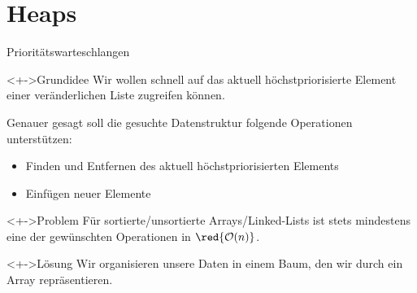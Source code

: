 \section{Heaps}

\begin{frame}{Priorit\"atswarteschlangen}
\begin{block}<+->{Grundidee}
Wir wollen schnell auf das aktuell h\"ochstpriorisierte Element einer \alert{ver\"anderlichen} Liste zugreifen k\"onnen.

Genauer gesagt soll die gesuchte Datenstruktur folgende Operationen unterst\"utzen:
\begin{itemize}
    \item \alert{Finden} und \alert{Entfernen} des aktuell h\"ochstpriorisierten Elements
    \item \alert{Einf\"ugen} neuer Elemente
\end{itemize}
\end{block}

\begin{block}<+->{Problem}
F\"ur sortierte/unsortierte Arrays/Linked-Lists ist stets mindestens eine der gew\"unschten Operationen in $\red{\bigO(n)}$.
\end{block}

\begin{block}<+->{L\"osung}
Wir organisieren unsere Daten in einem \alert{Baum}, den wir durch ein \alert{Array} repr\"asentieren.
\end{block}
\end{frame}

